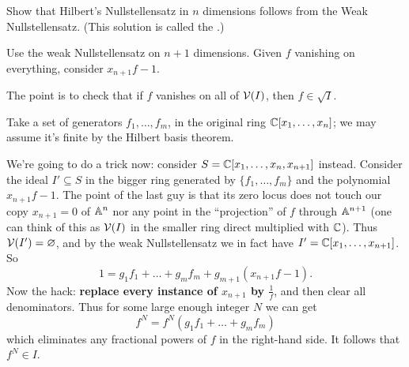 \begin{problem}
	\twochili
	\label{prob:hilbert_from_weak}
	Show that Hilbert's Nullstellensatz in $n$ dimensions
	follows from the Weak Nullstellensatz.
	(This solution is called the .)
	\begin{hint}
		Use the weak Nullstellensatz on $n+1$ dimensions.
		Given $f$ vanishing on everything,
		consider $x_{n+1}f-1$.
	\end{hint}
	\begin{sol}
		The point is to check that if $f$ vanishes on all of $\mathcal V(I)$,
		then $f \in \sqrt I$.

		Take a set of generators $f_1, \dots, f_m$,
		in the original ring $\mathbb C[x_1, \dots, x_n]$;
		we may assume it's finite by the Hilbert basis theorem.

		We're going to do a trick now:
		consider $S = \mathbb C[x_1, \dots, x_n, x_{n+1}]$ instead.
		Consider the ideal $I' \subseteq S$ in the bigger ring
		generated by $\{f_1, \dots, f_m\}$ and the polynomial $x_{n+1} f - 1$.
		The point of the last guy is that its zero locus
		does not touch our copy $x_{n+1}=0$ of $\mathbb A^n$
		nor any point in the ``projection'' of $f$ through $\mathbb A^{n+1}$
		(one can think of this as $\mathcal V(I)$ in the smaller ring
		direct multiplied with $\mathbb C$).
		Thus $\mathcal V(I') = \varnothing$, and by the weak Nullstellensatz
		we in fact have $I' = \mathbb C[x_1, \dots, x_{n+1}]$.
		So
		\[ 1 = g_1f_1 + \dots + g_mf_m + g_{m+1} \left( x_{n+1}f-1 \right). \]
		Now the hack: \textbf{replace every instance of $x_{n+1}$ by $\frac 1f$},
		and then clear all denominators.
		Thus for some large enough integer $N$ we can get
		\[ f^N = f^N(g_1f_1 + \dots + g_mf_m) \]
		which eliminates any fractional powers of $f$ in the right-hand side.
		It follows that $f^N \in I$.
	\end{sol}
\end{problem}
